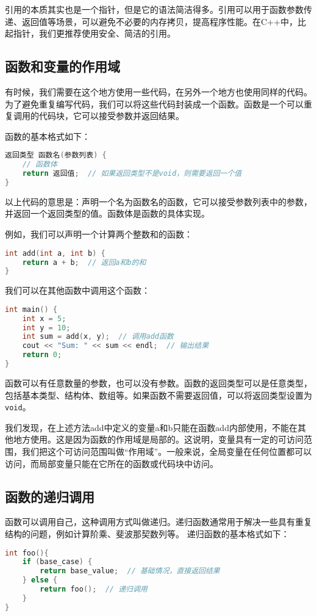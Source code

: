 \documentclass[../main.tex]{subfiles}
\begin{document}
引用的本质其实也是一个指针，但是它的语法简洁得多。引用可以用于函数参数传递、返回值等场景，可以避免不必要的内存拷贝，提高程序性能。在C++中，比起指针，我们更推荐使用安全、简洁的引用。

\subsection{函数和变量的作用域}

有时候，我们需要在这个地方使用一些代码，在另外一个地方也使用同样的代码。为了避免重复编写代码，我们可以将这些代码封装成一个函数。函数是一个可以重复调用的代码块，它可以接受参数并返回结果。

函数的基本格式如下：
\begin{lstlisting}[language=C++]
返回类型 函数名(参数列表) {
    // 函数体
    return 返回值;  // 如果返回类型不是void，则需要返回一个值
}
\end{lstlisting}
以上代码的意思是：声明一个名为函数名的函数，它可以接受参数列表中的参数，并返回一个返回类型的值。函数体是函数的具体实现。

例如，我们可以声明一个计算两个整数和的函数：
\begin{lstlisting}[language=C++]
int add(int a, int b) {
    return a + b;  // 返回a和b的和
}
\end{lstlisting}
我们可以在其他函数中调用这个函数：
\begin{lstlisting}[language=C++]
int main() {
    int x = 5;
    int y = 10;
    int sum = add(x, y);  // 调用add函数
    cout << "Sum: " << sum << endl;  // 输出结果
    return 0;
}
\end{lstlisting}

函数可以有任意数量的参数，也可以没有参数。函数的返回类型可以是任意类型，包括基本类型、结构体、数组等。如果函数不需要返回值，可以将返回类型设置为\texttt{void}。

我们发现，在上述方法add中定义的变量a和b只能在函数add内部使用，不能在其他地方使用。这是因为函数的作用域是局部的。这说明，变量具有一定的可访问范围，我们把这个可访问范围叫做“作用域”。一般来说，全局变量在任何位置都可以访问，而局部变量只能在它所在的函数或代码块中访问。

\subsection{函数的递归调用}

函数可以调用自己，这种调用方式叫做递归。递归函数通常用于解决一些具有重复结构的问题，例如计算阶乘、斐波那契数列等。
递归函数的基本格式如下：
\begin{lstlisting}[language=C++]
int foo(){
    if (base_case) {
        return base_value;  // 基础情况，直接返回结果
    } else {
        return foo();  // 递归调用
    }
}
\end{lstlisting}
\end{document}
